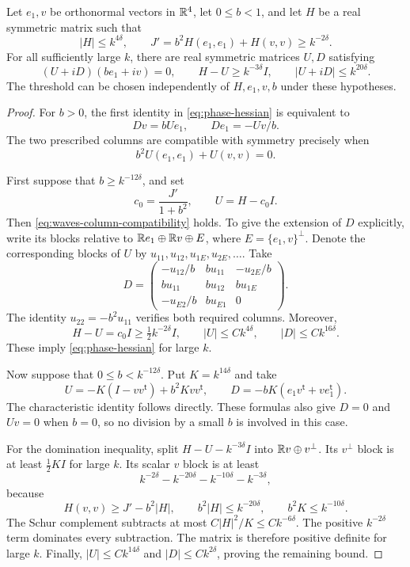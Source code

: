 \begin{lemma}\label{lem:phase-hessian}
Let \(e_1,v\) be orthonormal vectors in \(\mathbb R^4\), let \(0\le b<1\), and
let \(H\) be a real symmetric matrix such that
\[
 |H|\le k^{4\delta},\qquad
 J'=b^2H(e_1,e_1)+H(v,v)\ge k^{-2\delta}.
\]
For all sufficiently large \(k\), there are real symmetric matrices
\(U,D\) satisfying
\begin{equation}\label{eq:phase-hessian}
 (U+iD)(b e_1+i v)=0,\qquad
 H-U\ge k^{-3\delta}I,\qquad |U+iD|\le k^{20\delta}.
\end{equation}
The threshold can be chosen independently of \(H,e_1,v,b\) under these
hypotheses.
\end{lemma}

\begin{proof}
For \(b>0\), the first identity in \eqref{eq:phase-hessian} is equivalent
to
\[
 Dv=bUe_1,\qquad De_1=-Uv/b.
\]
The two prescribed columns are compatible with symmetry precisely when
\begin{equation}\label{eq:waves-column-compatibility}
 b^2U(e_1,e_1)+U(v,v)=0.
\end{equation}

First suppose that \(b\ge k^{-12\delta}\), and set
\[
 c_0=\frac{J'}{1+b^2},\qquad U=H-c_0I.
\]
Then \eqref{eq:waves-column-compatibility} holds. To give the extension
of \(D\) explicitly, write its blocks relative to
\(\mathbb R e_1\oplus\mathbb R v\oplus E\), where \(E=\{e_1,v\}^{\perp}\).
Denote the corresponding blocks of \(U\) by
\(u_{11},u_{12},u_{1E},u_{2E},\ldots\). Take
\[
 D=
 \begin{pmatrix}
 -u_{12}/b & b u_{11} & -u_{2E}/b\\
 b u_{11} & b u_{12} & b u_{1E}\\
 -u_{E2}/b & b u_{E1} & 0
 \end{pmatrix}.
\]
The identity \(u_{22}=-b^2u_{11}\) verifies both required columns.
Moreover,
\[
 H-U=c_0I\ge\tfrac12k^{-2\delta}I,\qquad
 |U|\le Ck^{4\delta},\qquad |D|\le Ck^{16\delta}.
\]
These imply \eqref{eq:phase-hessian} for large \(k\).

Now suppose that \(0\le b<k^{-12\delta}\). Put \(K=k^{14\delta}\) and
take
\[
 U=-K(I-vv^{\mathsf t})+b^2Kvv^{\mathsf t},\qquad
 D=-bK(e_1v^{\mathsf t}+ve_1^{\mathsf t}).
\]
The characteristic identity follows directly. These formulas also
give \(D=0\) and \(Uv=0\) when \(b=0\), so no division by a small \(b\)
is involved in this case.

For the domination inequality, split \(H-U-k^{-3\delta}I\) into
\(\mathbb R v\oplus v^\perp\). Its \(v^\perp\) block is at least
\(\tfrac12KI\) for large \(k\). Its scalar \(v\) block is at least
\[
 k^{-2\delta}-k^{-20\delta}-k^{-10\delta}-k^{-3\delta},
\]
because
\[
 H(v,v)\ge J'-b^2|H|,\qquad
 b^2|H|\le k^{-20\delta},\qquad b^2K\le k^{-10\delta}.
\]
The Schur complement subtracts at most
\(C|H|^2/K\le Ck^{-6\delta}\).
The positive \(k^{-2\delta}\) term dominates every subtraction.
The matrix is therefore positive definite for large \(k\).
Finally, \(|U|\le Ck^{14\delta}\) and \(|D|\le Ck^{2\delta}\),
proving the remaining bound.
\end{proof}

